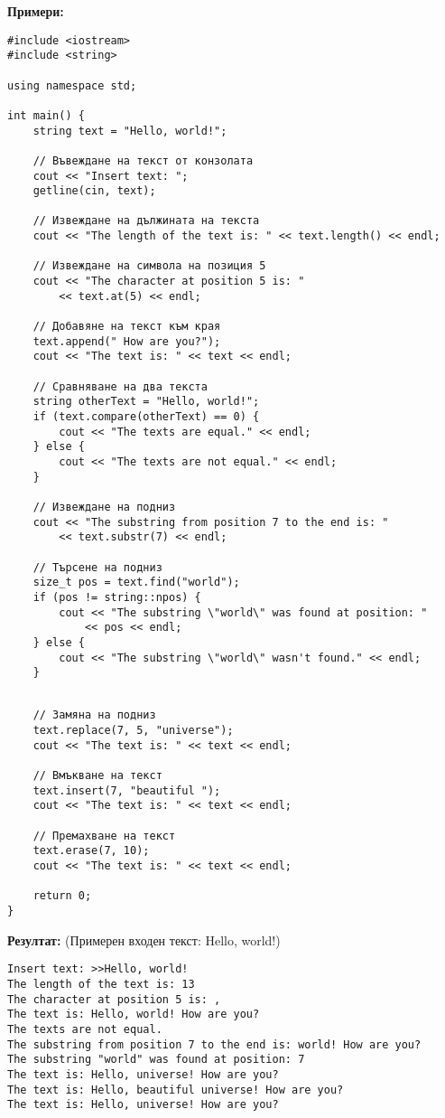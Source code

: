 \documentclass[oneside]{book}
\begin{document}
\textbf{Примери:}
\begin{mdframed}\begin{lstlisting}
#include <iostream>
#include <string>

using namespace std;

int main() {
    string text = "Hello, world!";

    // Въвеждане на текст от конзолата
    cout << "Insert text: ";
    getline(cin, text);

    // Извеждане на дължината на текста
    cout << "The length of the text is: " << text.length() << endl;

    // Извеждане на символа на позиция 5
    cout << "The character at position 5 is: "
        << text.at(5) << endl;

    // Добавяне на текст към края
    text.append(" How are you?");
    cout << "The text is: " << text << endl;

    // Сравняване на два текста
    string otherText = "Hello, world!";
    if (text.compare(otherText) == 0) {
        cout << "The texts are equal." << endl;
    } else {
        cout << "The texts are not equal." << endl;
    }

    // Извеждане на подниз
    cout << "The substring from position 7 to the end is: "
        << text.substr(7) << endl;

    // Търсене на подниз
    size_t pos = text.find("world");
    if (pos != string::npos) {
        cout << "The substring \"world\" was found at position: "
            << pos << endl;
    } else {
        cout << "The substring \"world\" wasn't found." << endl;
    }
\end{lstlisting}\end{mdframed}
\begin{mdframed}\begin{lstlisting}[firstnumber=last]
    
    // Замяна на подниз
    text.replace(7, 5, "universe");
    cout << "The text is: " << text << endl;

    // Вмъкване на текст
    text.insert(7, "beautiful ");
    cout << "The text is: " << text << endl;

    // Премахване на текст
    text.erase(7, 10);
    cout << "The text is: " << text << endl;

    return 0;
}
\end{lstlisting}\end{mdframed}

\textbf{Резултат:} (Примерен входен текст: Hello, world!)
\begin{mdframed}\begin{lstlisting}[language={}]
Insert text: >>Hello, world!
The length of the text is: 13
The character at position 5 is: ,
The text is: Hello, world! How are you?
The texts are not equal.
The substring from position 7 to the end is: world! How are you?
The substring "world" was found at position: 7
The text is: Hello, universe! How are you?
The text is: Hello, beautiful universe! How are you?
The text is: Hello, universe! How are you?
\end{lstlisting}\end{mdframed}
\end{document}
